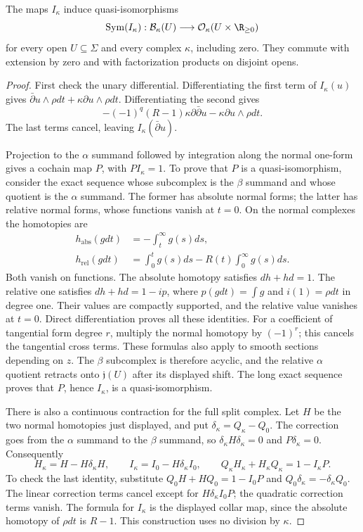 \begin{theorem}
\label{thm:bf-quantum-boundary}
The maps $I_\kappa$ induce quasi-isomorphisms
\[
 \operatorname{Sym}(I_\kappa):\mathcal B_\kappa(U)
       \longrightarrow\mathcal O_\kappa(U\times\R_{\ge0})
\]
for every open $U\subseteq\Sigma$ and every complex $\kappa$,
including zero.  They commute with extension by zero and with
factorization products on disjoint opens.
\end{theorem}
\begin{proof}
First check the unary differential.  Differentiating the first term
of $I_\kappa(u)$ gives
$\bar\partial u\wedge\rho dt+\kappa\partial u\wedge\rho dt$.
Differentiating the second gives
\[
 -(-1)^q(R-1)\kappa\partial\bar\partial u
                          -\kappa\partial u\wedge\rho dt.
\]
The last terms cancel, leaving $I_\kappa(\bar\partial u)$.

Projection to the $\alpha$ summand followed by integration along the
normal one-form gives a cochain map $P$, with $PI_\kappa=1$.
To prove that $P$ is a quasi-isomorphism, consider the exact sequence
whose subcomplex is the $\beta$ summand and whose quotient is the
$\alpha$ summand.  The former has absolute normal forms; the latter
has relative normal forms, whose functions vanish at $t=0$.
On the normal complexes the homotopies are
\[
 \begin{split}
 h_{\mathrm{abs}}(gdt)&=-\int_t^\infty g(s)ds,\\
 h_{\mathrm{rel}}(gdt)&=\int_0^t g(s)ds-R(t)\int_0^\infty g(s)ds.
 \end{split}
\]
Both vanish on functions.  The absolute homotopy satisfies $dh+hd=1$.
The relative one satisfies $dh+hd=1-ip$, where
$p(gdt)=\int g$ and $i(1)=\rho dt$ in degree one.
Their values are compactly supported, and the relative value vanishes
at $t=0$.  Direct differentiation proves all these identities.
For a coefficient of tangential form degree $r$, multiply the
normal homotopy by $(-1)^r$; this cancels the tangential cross terms.
These formulas also apply to smooth sections depending on $z$.
The $\beta$ subcomplex is therefore acyclic, and the relative
$\alpha$ quotient retracts onto $\mathfrak j(U)$ after its displayed
shift.  The long exact sequence proves that $P$, hence $I_\kappa$,
is a quasi-isomorphism.

There is also a continuous contraction for the full split complex.
Let $H$ be the two normal homotopies just displayed, and put
$\delta_\kappa=Q_\kappa-Q_0$.  The correction goes from the
$\alpha$ summand to the $\beta$ summand, so
$\delta_\kappa H\delta_\kappa=0$ and $P\delta_\kappa=0$.
Consequently
\[
 H_\kappa=H-H\delta_\kappa H,\qquad
 I_\kappa=I_0-H\delta_\kappa I_0,\qquad
 Q_\kappa H_\kappa+H_\kappa Q_\kappa=1-I_\kappa P.
\]
To check the last identity, substitute
$Q_0H+HQ_0=1-I_0P$ and
$Q_0\delta_\kappa=-\delta_\kappa Q_0$.
The linear correction terms cancel except for
$H\delta_\kappa I_0P$; the quadratic correction terms vanish.
The formula for $I_\kappa$ is the displayed collar map, since the
absolute homotopy of $\rho dt$ is $R-1$.
This construction uses no division by $\kappa$.


\end{proof}
